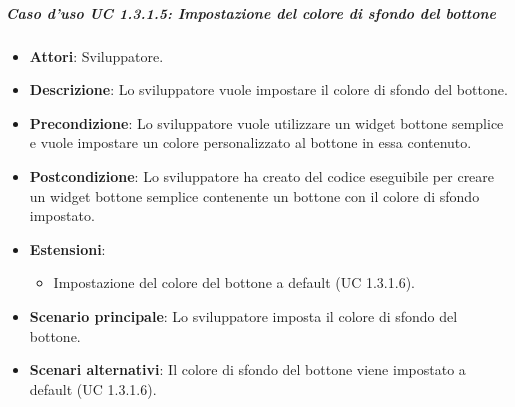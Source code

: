 \subparagraph{Caso d'uso UC 1.3.1.5: Impostazione del colore di sfondo del bottone}

\FloatBarrier
\begin{itemize}
\item\textbf{Attori}: Sviluppatore.
\item\textbf{Descrizione}: Lo sviluppatore vuole impostare il colore di sfondo del bottone.
\item\textbf{Precondizione}: Lo sviluppatore vuole utilizzare un widget bottone semplice e vuole impostare un colore personalizzato al bottone in essa contenuto.
\item\textbf{Postcondizione}: Lo sviluppatore ha creato del codice eseguibile per creare un widget bottone semplice contenente un bottone con il colore di sfondo impostato.
\item\textbf{Estensioni}: 
\begin{itemize}
\item Impostazione del colore del bottone a default (UC 1.3.1.6).
\end{itemize}
\item\textbf{Scenario principale}: Lo sviluppatore imposta il colore di sfondo del bottone.
\item\textbf{Scenari alternativi}: Il colore di sfondo del bottone viene impostato a default (UC 1.3.1.6).
\end{itemize}
